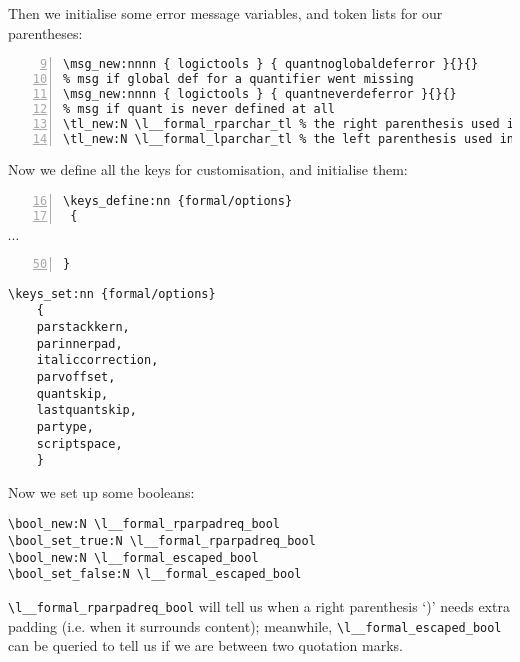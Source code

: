 \documentclass{article}
\begin{document}
Then we initialise some error message variables, and token lists for our parentheses:
\begin{Verbatim}[numbers=left,xleftmargin=5mm,firstnumber=9]
\msg_new:nnnn { logictools } { quantnoglobaldeferror }{}{} 
% msg if global def for a quantifier went missing
\msg_new:nnnn { logictools } { quantneverdeferror }{}{} 
% msg if quant is never defined at all
\tl_new:N \l__formal_rparchar_tl % the right parenthesis used in formallogic
\tl_new:N \l__formal_lparchar_tl % the left parenthesis used in formallogic
\end{Verbatim}

Now we define all the keys for customisation, and initialise them: 
\vspace{\topsep}
\begin{Verbatim}[numbers=left,xleftmargin=5mm,firstnumber=16,vspace=0pt]
\keys_define:nn {formal/options}
 {
\end{Verbatim}
\qquad\quad $\cdots$
\begin{Verbatim}[numbers=left,xleftmargin=5mm,firstnumber=50,vspace=0pt]
 }
\end{Verbatim}
\begin{Verbatim}[vspace=0pt]
\keys_set:nn {formal/options}
    {
    parstackkern,
    parinnerpad,
    italiccorrection,
    parvoffset,
    quantskip,
    lastquantskip,
    partype,
    scriptspace,
    }
\end{Verbatim}
\vspace{\topsep}
Now we set up some booleans:
\begin{Verbatim}
\bool_new:N \l__formal_rparpadreq_bool 
\bool_set_true:N \l__formal_rparpadreq_bool
\bool_new:N \l__formal_escaped_bool 
\bool_set_false:N \l__formal_escaped_bool
\end{Verbatim}
\verb|\l__formal_rparpadreq_bool| will tell us when a right parenthesis `)' needs extra padding (i.e. when it surrounds content); meanwhile, \verb|\l__formal_escaped_bool| can be queried to tell us if we are between two quotation marks. 
\end{document}
